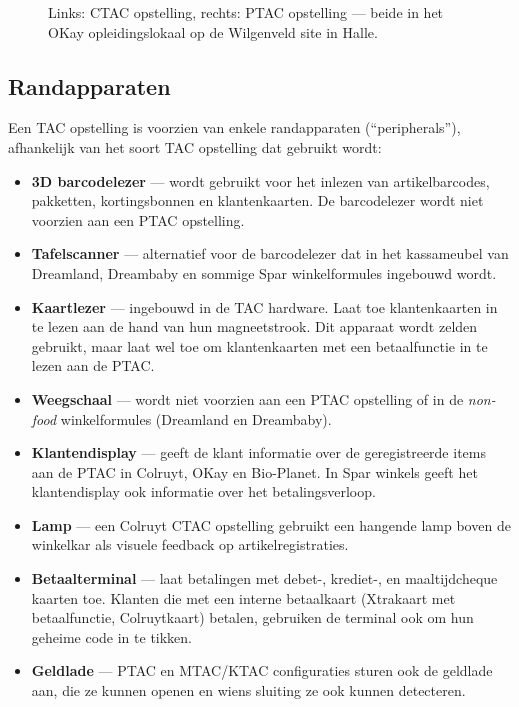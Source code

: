 \begin{figure}%
    \centering
    \qquad
    \caption{Links: CTAC opstelling, rechts: PTAC opstelling — beide in het OKay opleidingslokaal op de Wilgenveld site in Halle.}%
    \label{fig:ctac-ptac-okay}%
\end{figure}

\subsection{Randapparaten}

Een TAC opstelling is voorzien van enkele randapparaten (``peripherals''), afhankelijk van het soort TAC opstelling dat gebruikt wordt:

\begin{itemize}
    \item \textbf{3D barcodelezer} — wordt gebruikt voor het inlezen van artikelbarcodes, pakketten, kortingsbonnen en klantenkaarten. De barcodelezer wordt niet voorzien aan een PTAC opstelling.
    \item \textbf{Tafelscanner} — alternatief voor de barcodelezer dat in het kassameubel van Dreamland, Dreambaby en sommige Spar winkelformules ingebouwd wordt.
    \item \textbf{Kaartlezer} — ingebouwd in de TAC hardware. Laat toe klantenkaarten in te lezen aan de hand van hun magneetstrook. Dit apparaat wordt zelden gebruikt, maar laat wel toe om klantenkaarten met een betaalfunctie in te lezen aan de PTAC.
    \item \textbf{Weegschaal} — wordt niet voorzien aan een PTAC opstelling of in de \emph{non-food} winkelformules (Dreamland en Dreambaby).
    \item \textbf{Klantendisplay} — geeft de klant informatie over de geregistreerde items aan de PTAC in Colruyt, OKay en Bio-Planet. In Spar winkels geeft het klantendisplay ook informatie over het betalingsverloop.
    \item \textbf{Lamp} — een Colruyt CTAC opstelling gebruikt een hangende lamp boven de winkelkar als visuele feedback op artikelregistraties.
    \item \textbf{Betaalterminal} — laat betalingen met debet-, krediet-, en maaltijdcheque kaarten toe. Klanten die met een interne betaalkaart (Xtrakaart met betaalfunctie, Colruytkaart) betalen, gebruiken de terminal ook om hun geheime code in te tikken.
    \item \textbf{Geldlade} — PTAC en MTAC/KTAC configuraties sturen ook de geldlade aan, die ze kunnen openen en wiens sluiting ze ook kunnen detecteren.
\end{itemize}

